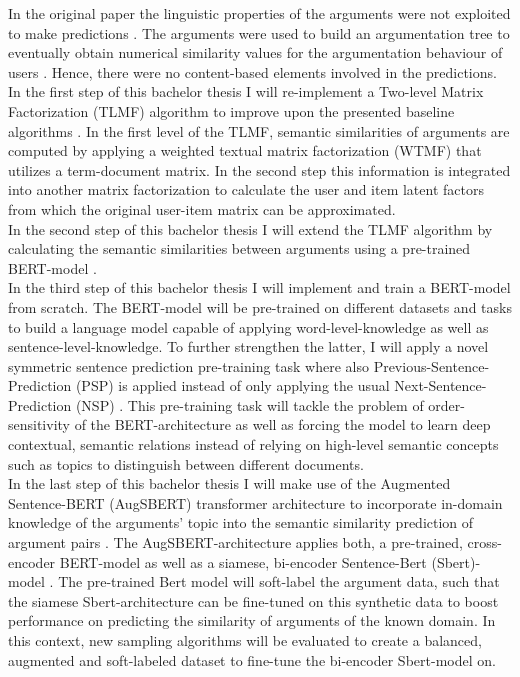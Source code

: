 \documentclass{article}
\begin{document}
In the original paper the linguistic properties of the arguments were not exploited to make predictions \cite{HowIArgue}. 
The arguments were used to build an argumentation tree to eventually obtain numerical similarity
values for the argumentation behaviour of users \cite{brenneis2020much}. Hence, there were no content-based elements involved
in the predictions.\\ 
In the first step of this bachelor thesis I will re-implement a Two-level Matrix Factorization (TLMF) algorithm to improve upon the presented baseline algorithms \cite{li2016two}.
In the first level of the TLMF, semantic similarities of arguments are computed by applying a weighted textual matrix factorization (WTMF) that utilizes a term-document matrix.
In the second step this information is integrated into another matrix factorization to calculate the
user and item latent factors from which the original user-item matrix can be approximated.\\
In the second step of this bachelor thesis I will extend the TLMF algorithm by calculating the semantic similarities between arguments using 
a pre-trained BERT-model \cite{devlin2018bert}.\\
In the third step of this bachelor thesis I will implement and train a BERT-model from scratch. The BERT-model will be pre-trained on different datasets and tasks to build a language model 
capable of applying word-level-knowledge as well as sentence-level-knowledge. To further strengthen the latter, I will apply a novel symmetric sentence prediction pre-training 
task where also Previous-Sentence-Prediction (PSP) is applied instead of only applying the usual Next-Sentence-Prediction (NSP) \cite{xu2020symmetric}.
This pre-training task will tackle the problem of order-sensitivity of the BERT-architecture as well as forcing the model to learn deep contextual, semantic relations instead
of relying on high-level semantic concepts such as topics to distinguish between different documents.\\
In the last step of this bachelor thesis I will make use of the Augmented Sentence-BERT (AugSBERT) transformer architecture to incorporate
in-domain knowledge of the arguments' topic into the semantic similarity prediction of argument pairs \cite{thakur2020augmented}.
The AugSBERT-architecture applies both, a pre-trained, cross-encoder BERT-model as well as a siamese, bi-encoder Sentence-Bert (Sbert)-model \cite{reimers2019sentence}.
The pre-trained Bert model will soft-label the argument data, such that the siamese Sbert-architecture can be fine-tuned
on this synthetic data to boost performance on predicting the similarity of arguments of the known domain.
In this context, new sampling algorithms will be evaluated to create a balanced, augmented and soft-labeled dataset to fine-tune the
bi-encoder Sbert-model on. 

\printbibliography
\end{document}
